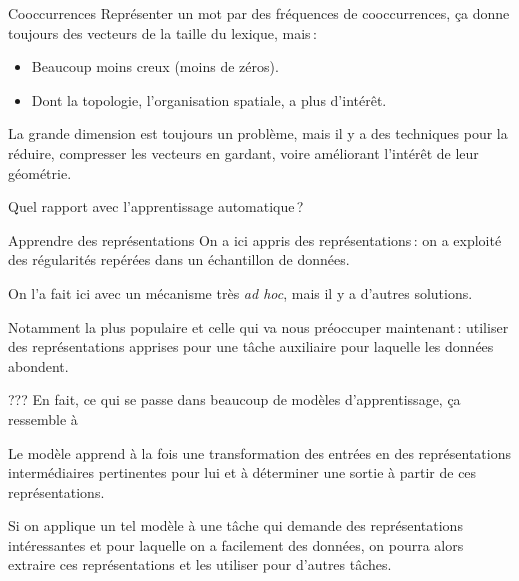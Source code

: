 \documentclass[
	xcolor={svgnames},
	aspectratio=169,
	french,
]{beamer}
\begin{document}
\begin{frame}{Cooccurrences}
	Représenter un mot par des fréquences de cooccurrences, ça donne toujours des vecteurs de la
	taille du lexique, \alert<1>{mais} :

	\pause

	\begin{itemize}[<+->]
		\item Beaucoup moins creux (moins de zéros).
		\item Dont la \alert{topologie}, l'organisation spatiale, a plus d'intérêt.
	\end{itemize}

	\pause

	La grande dimension est toujours un problème, mais il y a des techniques pour la réduire,
	\alert{compresser} les vecteurs en gardant, voire améliorant l'intérêt de leur
	\alert{géométrie}.
\end{frame}

\begin{frame}[standout]
	Quel rapport avec l'apprentissage automatique ?
\end{frame}

\begin{frame}{Apprendre des représentations}
	On a ici \alert{appris} des représentations : on a exploité des \alert{régularités} repérées
	dans un \alert{échantillon de données}.

	\pause

	On l'a fait ici avec un mécanisme très \emph{ad hoc}, mais il y a d'autres solutions.

	\pause

	Notamment la plus populaire et celle qui va nous préoccuper maintenant : utiliser des
	représentations apprises pour une \alert{tâche auxiliaire} pour laquelle les données abondent.
\end{frame}

\begin{frame}[fragile]{???}
	En fait, ce qui se passe dans beaucoup de modèles d'apprentissage, ça ressemble à

	\begin{figure}
	\end{figure}

	\pause

	Le modèle apprend à la fois une transformation des entrées en des \alert{représentations
	intermédiaires} pertinentes pour lui et à déterminer une sortie à partir de ces représentations.

	\pause

	Si on applique un tel modèle à une tâche qui demande des représentations intéressantes et pour
	laquelle on a facilement des données, on pourra alors extraire ces représentations et les
	utiliser pour d'autres tâches.
\end{frame}
\end{document}
